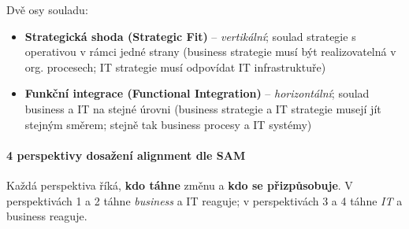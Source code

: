 Dvě osy souladu:
\begin{itemize}
  \item \textbf{Strategická shoda (Strategic Fit)} -- \textit{vertikální}; soulad strategie s operativou
    v rámci jedné strany (business strategie musí být realizovatelná v org. procesech;
    IT strategie musí odpovídat IT infrastruktuře)
  \item \textbf{Funkční integrace (Functional Integration)} -- \textit{horizontální}; soulad business a IT
    na stejné úrovni (business strategie a IT strategie musejí jít stejným směrem;
    stejně tak business procesy a IT systémy)
\end{itemize}

\paragraph{4 perspektivy dosažení alignment dle SAM}

Každá perspektiva říká, \textbf{kdo táhne} změnu a \textbf{kdo se přizpůsobuje}.
V perspektivách 1 a 2 táhne \textit{business} a IT reaguje; v perspektivách 3 a 4 táhne \textit{IT} a business reaguje.

